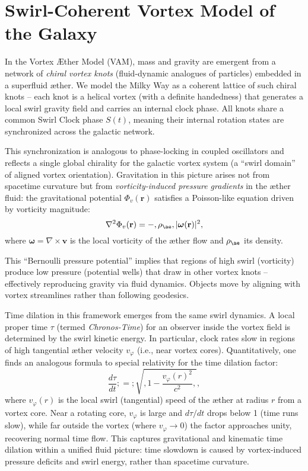\section*{Swirl-Coherent Vortex Model of the Galaxy}

In the Vortex \AE ther Model (VAM), mass and gravity are emergent from a network of \emph{chiral vortex knots} (fluid-dynamic analogues of particles) embedded in a superfluid \ae ther. We model the Milky Way as a coherent lattice of such chiral knots -- each knot is a helical vortex (with a definite handedness) that generates a local swirl gravity field and carries an internal clock phase. All knots share a common Swirl Clock phase $S(t)$, meaning their internal rotation states are synchronized across the galactic network\cite{iskandarani2025vam2}.

This synchronization is analogous to phase-locking in coupled oscillators and reflects a single global chirality for the galactic vortex system (a ``swirl domain'' of aligned vortex orientation). Gravitation in this picture arises not from spacetime curvature but from \emph{vorticity-induced pressure gradients} in the \ae ther fluid: the gravitational potential $\Phi_v(\mathbf{r})$ satisfies a Poisson-like equation driven by vorticity magnitude\cite{iskandarani2025vam2}:
\begin{equation}
\nabla^2 \Phi_v(\mathbf{r}) = -,\rho_{\ae} ,|\boldsymbol{\omega}(\mathbf{r})|^2,
\label{eq:swirl-grav}
\end{equation}
where $\boldsymbol{\omega}=\nabla\times \mathbf{v}$ is the local vorticity of the \ae ther flow and $\rho_{\ae}$ its density\cite{iskandarani2025vam2}.

This ``Bernoulli pressure potential'' implies that regions of high swirl (vorticity) produce low pressure (potential wells) that draw in other vortex knots -- effectively reproducing gravity via fluid dynamics. Objects move by aligning with vortex streamlines rather than following geodesics\cite{iskandarani2025vam2}.

Time dilation in this framework emerges from the same swirl dynamics. A local proper time $\tau$ (termed \emph{Chronos-Time}) for an observer inside the vortex field is determined by the swirl kinetic energy. In particular, clock rates slow in regions of high tangential \ae ther velocity $v_{\varphi}$ (i.e., near vortex cores). Quantitatively, one finds an analogous formula to special relativity for the time dilation factor:
\begin{equation}
\frac{d\tau}{dt} ;=; \sqrt{,1 - \frac{v_{\varphi}(r)^2}{c^2},},
\label{eq:swirl-time}
\end{equation}
where $v_{\varphi}(r)$ is the local swirl (tangential) speed of the \ae ther at radius $r$ from a vortex core. Near a rotating core, $v_{\varphi}$ is large and $d\tau/dt$ drops below 1 (time runs slow), while far outside the vortex (where $v_{\varphi}\to 0$) the factor approaches unity, recovering normal time flow. This captures gravitational and kinematic time dilation within a unified fluid picture: time slowdown is caused by vortex-induced pressure deficits and swirl energy, rather than spacetime curvature\cite{iskandarani2025vam2}.

